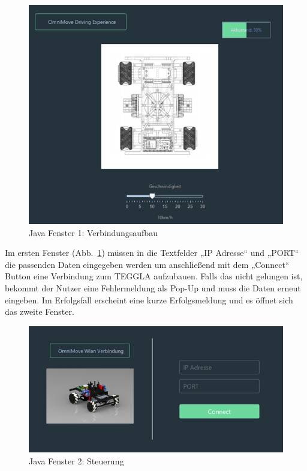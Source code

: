 \begin{figure}[!ht]
	\centering
	\includegraphics[width=\textwidth]{bilder/java1.png}
	\caption{Java Fenster 1: Verbindungsaufbau}
	\label{bild:java1}
\end{figure}


Im ersten Fenster (Abb.~\ref{bild:java1}) müssen in die Textfelder „IP Adresse“ und „PORT“ die passenden Daten eingegeben werden um anschließend mit dem „Connect“ Button eine Verbindung zum TEGGLA aufzubauen. 
Falls das nicht gelungen ist, bekommt der Nutzer eine Fehlermeldung als Pop-Up und muss die Daten erneut eingeben. 
Im Erfolgsfall erscheint eine kurze Erfolgsmeldung und es öffnet sich das zweite Fenster.

\begin{figure}[!ht]
	\centering
	\includegraphics[width=\textwidth]{bilder/java2.png}
	\caption{Java Fenster 2: Steuerung}
	\label{bild:java2}
\end{figure}

